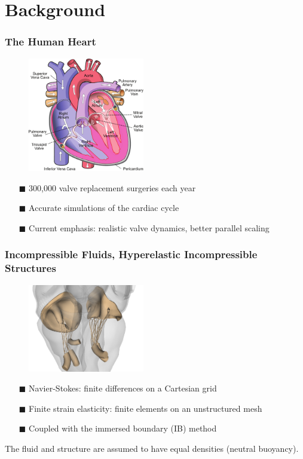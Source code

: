 \documentclass[8pt]{beamer}
\begin{document}
\section{Background}
\begin{frame}
    \frametitle{The Human Heart}
    \begin{figure}
        \centering
        \includegraphics[width=2in]{diagram-of-the-human-heart.pdf}
    \end{figure}
    \begin{itemize}
        \item[$\blacksquare$] 300,000 valve replacement surgeries each year
        \item[$\blacksquare$] Accurate simulations of the cardiac cycle
        \item[$\blacksquare$] Current emphasis: realistic valve dynamics, better
        parallel scaling
    \end{itemize}
\end{frame}

\begin{frame}
    \frametitle{Incompressible Fluids, Hyperelastic Incompressible Structures}
    \begin{figure}
        \centering
        \includegraphics[width=2in]{mv_tv_front0037.png}
    \end{figure}
    \begin{itemize}
        \item[$\blacksquare$] Navier-Stokes: finite differences on a Cartesian grid
        \item[$\blacksquare$] Finite strain elasticity: finite elements on an
        unstructured mesh
        \item[$\blacksquare$] Coupled with the immersed boundary (IB) method
    \end{itemize}
    The fluid and structure are assumed to have equal densities (neutral
    buoyancy).
\end{frame}
\end{document}
